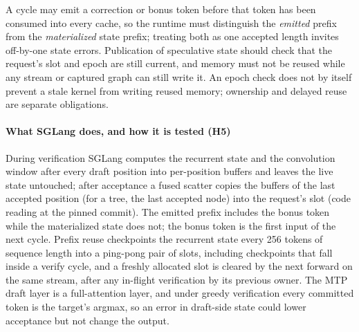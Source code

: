 A cycle may emit a correction or bonus token before that token has been consumed into every cache, so the runtime must distinguish the \emph{emitted} prefix from the \emph{materialized} state prefix; treating both as one accepted length invites off-by-one state errors. Publication of speculative state should check that the request's slot and epoch are still current, and memory must not be reused while any stream or captured graph can still write it. An epoch check does not by itself prevent a stale kernel from writing reused memory; ownership and delayed reuse are separate obligations.

\paragraph{What SGLang does, and how it is tested (H5)} During verification SGLang computes the recurrent state and the convolution window after every draft position into per-position buffers and leaves the live state untouched; after acceptance a fused scatter copies the buffers of the last accepted position (for a tree, the last accepted node) into the request's slot (code reading at the pinned commit). The emitted prefix includes the bonus token while the materialized state does not; the bonus token is the first input of the next cycle. Prefix reuse checkpoints the recurrent state every 256 tokens of sequence length into a ping-pong pair of slots, including checkpoints that fall inside a verify cycle, and a freshly allocated slot is cleared by the next forward on the same stream, after any in-flight verification by its previous owner. The MTP draft layer is a full-attention layer, and under greedy verification every committed token is the target's argmax, so an error in draft-side state could lower acceptance but not change the output.

